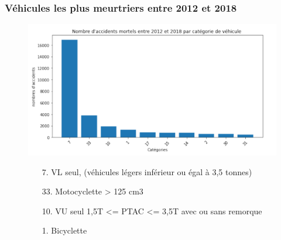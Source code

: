\documentclass{beamer}
\theoremstyle{definition}
\begin{document}
\begin{frame}
	\frametitle{Véhicules les plus meurtriers entre 2012 et 2018}
	\centering
	\begin{minipage}[c]{1\linewidth}\centering\begin{figure}
			
			\includegraphics[width=0.8\linewidth]{vehicules.png}
		\end{figure}
	\end{minipage}
	\begin{minipage}[c]{1\linewidth}\centering\begin{figure}
			\begin{multicols}{2}
				\begin{enumerate}
					\item[7.] VL seul, (véhicules légers inférieur ou égal à 3,5 tonnes)
					\item[33.] Motocyclette > 125 cm3
					\item[10.] VU seul 1,5T <= PTAC <= 3,5T avec ou sans remorque 
					\item[1.] Bicyclette
				\end{enumerate}	
			\end{multicols}
		
		
	\end{figure}
\end{minipage}
	
\end{frame}
\end{document}
